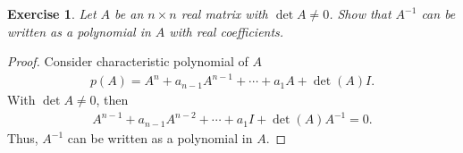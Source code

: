 \documentclass[11pt]{book}
\newtheorem{exercise}{Exercise}[section]
\theoremstyle{definition}
\numberwithin{equation}{chapter}
\begin{document}
\medskip

\begin{exercise}
Let $A$ be an $n \times n$ real matrix with $\det A \neq 0$. Show that $A^{-1}$ can be written as a polynomial in $A$ with real coefficients.
\end{exercise}
\begin{proof}
Consider characteristic polynomial of $A$
\begin{align*}
    p(A) = A^n + a_{n-1}A^{n-1} + \cdots + a_1 A + \det(A)I.
\end{align*}
With $\det A \neq 0$, then
\begin{align*}
    A^{n-1} + a_{n-1}A^{n-2} + \cdots + a_1 I + \det(A) A^{-1} = 0.
\end{align*}
Thus, $A^{-1}$ can be written as a polynomial in $A$.
\end{proof}

\medskip
\end{document}
